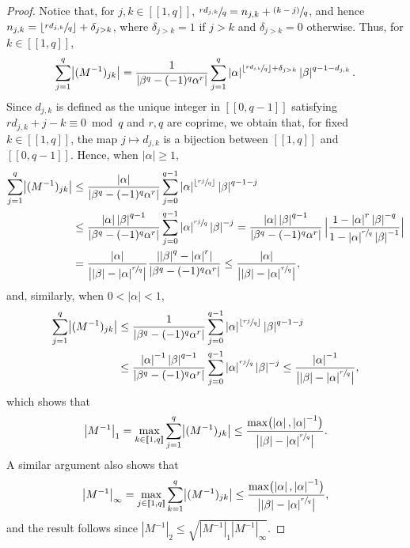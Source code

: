 \documentclass[JEP,XML,SOM,Unicode]{cedram}
\newcommand{\psfrac}[2]{\sfrac{(#1)}{#2}}
\newcommand{\llbracket}{[\![}
\newcommand{\rrbracket}{]\!]}
\theoremstyle{plain}
\theoremstyle{definition}
\newcommand{\abs}[1]{\left\lvert #1\right \rvert}
\newcommand{\floor}[1]{\left\lfloor #1 \right\rfloor}
\newcommand{\babs}[1]{\bigl\lvert #1\bigr \rvert}
\newcommand{\Babs}[1]{\Bigl\lvert #1\Bigr \rvert}
\begin{document}
\begin{proof}
Notice that, for $j, k \in \llbracket 1, q\rrbracket$, $\sfrac{r d_{j, k}}{q} = n_{j, k} + \psfrac{k-j}{q}$, and hence $n_{j, k} = \floor{\sfrac{r d_{j, k}}{q}} + \delta_{j > k}$, where $\delta_{j > k} = 1$ if $j > k$ and $\delta_{j > k} = 0$ otherwise. Thus, for $k \in \llbracket 1, q\rrbracket$,\vspace*{-3pt}
\[
\sum_{j=1}^q \babs{(M^{-1})_{jk}} = \frac{1}{\abs{\beta^q - (-1)^q \alpha^r}} \sum_{j=1}^q \abs{\alpha}^{\floor{\sfrac{r d_{j, k}}{q}} + \delta_{j > k}} \abs{\beta}^{q-1-d_{j, k}}.
\]
Since $d_{j, k}$ is defined as the unique integer in $\llbracket 0, q-1\rrbracket$ satisfying $r d_{j, k} + j - k \equiv 0 \bmod q$ and $r, q$ are coprime, we obtain that, for fixed $k \in \llbracket 1, q\rrbracket$, the map $j \mapsto d_{j, k}$ is a bijection between $\llbracket 1, q\rrbracket$ and $\llbracket 0, q-1\rrbracket$. Hence, when $\abs{\alpha} \geq 1$,\vspace*{-3pt}
\begin{align*}
\sum_{j=1}^q \babs{(M^{-1})_{jk}} & \leq \frac{\abs{\alpha}}{\abs{\beta^q - (-1)^q \alpha^r}} \sum_{j=0}^{q-1} \abs{\alpha}^{\floor{\sfrac{r j}{q}}} \abs{\beta}^{q-1-j}\\
&\leq \frac{\abs{\alpha} \abs{\beta}^{q-1}}{\abs{\beta^q - (-1)^q \alpha^r}} \sum_{j=0}^{q-1} \abs{\alpha}^{\sfrac{r j}{q}} \abs{\beta}^{-j} = \frac{\abs{\alpha} \abs{\beta}^{q-1}}{\abs{\beta^q - (-1)^q \alpha^r}}\, \Babs{\frac{1 - \abs{\alpha}^r \abs{\beta}^{-q}}{1 - \abs{\alpha}^{\sfrac{r}{q}} \abs{\beta}^{-1}}}\\
&= \frac{\abs{\alpha}}{\babs{\abs{\beta} - \abs{\alpha}^{\sfrac{r}{q}}}} \frac{\abs{\abs{\beta}^q - \abs{\alpha}^r}}{\abs{\beta^q - (-1)^q \alpha^r}} \leq \frac{\abs{\alpha}}{\babs{\abs{\beta} - \abs{\alpha}^{\sfrac{r}{q}}}},
\end{align*}
and, similarly, when $0 < \abs{\alpha} < 1$,
\begin{align*}
\sum_{j=1}^q \babs{(M^{-1})_{jk}} & \leq \frac{1}{\abs{\beta^q - (-1)^q \alpha^r}} \sum_{j=0}^{q-1} \abs{\alpha}^{\floor{\sfrac{r j}{q}}} \abs{\beta}^{q-1-j}\\
&\leq \frac{\abs{\alpha}^{-1} \abs{\beta}^{q-1}}{\abs{\beta^q - (-1)^q \alpha^r}} \sum_{j=0}^{q-1} \abs{\alpha}^{\sfrac{r j}{q}} \abs{\beta}^{-j}  \leq \frac{\abs{\alpha}^{-1}}{\babs{\abs{\beta} - \abs{\alpha}^{\sfrac{r}{q}}}},
\end{align*}
which shows that
\[
\babs{M^{-1}}_{1} = \max_{k \in \llbracket 1, q\rrbracket} \sum_{j=1}^q \babs{(M^{-1})_{jk}} \leq \frac{\max\bigl(\abs{\alpha}, \abs{\alpha}^{-1}\bigr)}{\babs{\abs{\beta} - \abs{\alpha}^{\sfrac{r}{q}}}}.
\]
A similar argument also shows that
\[
\babs{M^{-1}}_{\infty} = \max_{j \in \llbracket 1, q\rrbracket} \sum_{k=1}^q \babs{(M^{-1})_{jk}} \leq \frac{\max\bigl(\abs{\alpha}, \abs{\alpha}^{-1}\bigr)}{\babs{\abs{\beta} - \abs{\alpha}^{\sfrac{r}{q}}}},
\]
and the result follows since $\abs{M^{-1}}_{2} \leq \sqrt{\abs{M^{-1}}_{1} \abs{M^{-1}}_{\infty}}$.
\end{proof}

\backmatter


\end{document}
